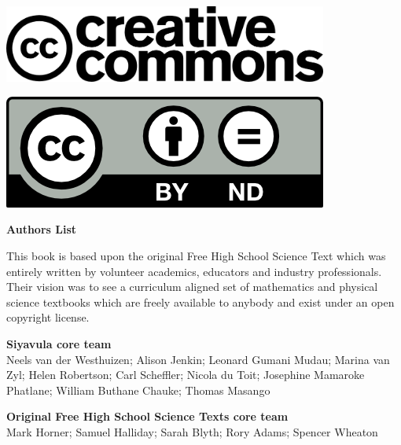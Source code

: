 \vspace*{4in}

\begin{center}
\begin{minipage}{0.6\textwidth}
\includegraphics[width=0.8\textwidth]{title_images/cc2.png}
\end{minipage}
\begin{minipage}{0.3\textwidth}
\includegraphics[width=0.8\textwidth]{title_images/cc1.png}
\end{minipage}
\end{center}

\newpage
\thispagestyle{empty}

 \pagestyle{empty}
\begin{flushleft} \textbf{\LARGE Authors List} \end{flushleft}

{This book is based upon the original Free High School Science Text which was entirely written by
volunteer academics, educators and industry professionals. Their vision was to see a curriculum aligned
set of mathematics and physical science textbooks which are freely available to anybody and exist
under an open copyright license.} \par

\textbf{\large Siyavula core team} \\

Neels van der Westhuizen; Alison Jenkin; Leonard Gumani Mudau; Marina van Zyl; Helen Robertson; Carl Scheffler; Nicola du Toit; Josephine Mamaroke Phatlane; William Buthane Chauke; Thomas Masango \par

\textbf{\large Original Free High School Science Texts core team}\\

Mark Horner; Samuel Halliday; Sarah Blyth; Rory Adams; Spencer Wheaton \par 


